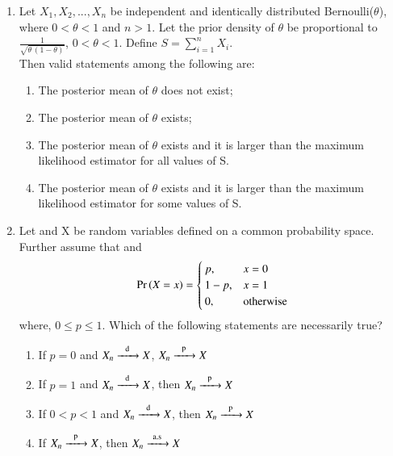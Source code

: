 \begin{enumerate}[label=\thesection.\arabic*.,ref=\thesection.\theenumi]
\item Let $X_1,X_2,...,X_n$ be independent and identically distributed Bernoulli($\theta$), where $0<\theta<1$ and $n>1$. Let the prior density of $\theta$ be proportional to $\frac{1}{\sqrt{\theta\,(1-\theta)}}$, $0<\theta<1$. Define $S=\sum_{i=1}^nX_i$.\\[1pt] Then valid statements among the following are:
\begin{enumerate}[label = \arabic*.]
    \item The posterior mean of $\theta$ does not exist;
    \item The posterior mean of $\theta$ exists;
    \item The posterior mean of $\theta$ exists and it is larger than the maximum likelihood estimator for all values of S.
    \item The posterior mean of $\theta$ exists and it is larger than the maximum likelihood estimator for some values of S.
\end{enumerate}
\solution

%
\item Let  and X be random variables defined on a common probability space. Further assume that  and
\begin{align}
\Pr\left(X = x\right) =\begin{cases}
   p, & x = 0  \\
   1-p, & x =1 \\
    0, &\text{otherwise} 
\end{cases}\end{align}
where, $0 \leq p \leq 1$. Which of the following statements are necessarily true?
\begin{enumerate}
   \item If $p = 0$ and $X_n \ce{->[d]} X$, $X_n \ce{->[p]} X$ 
   \item If $p = 1$ and $X_n \ce{->[d]} X$, then $X_n  \ce{->[p]} X$
   \item If $0<p<1$ and $X_n \ce{->[d]} X$, then $X_n \ce{->[p]} X$
   \item If $X_n \ce{->[p]} X$, then $X_n  \ce{->T[a.s]} X$
\end{enumerate}
\solution



\end{enumerate}
